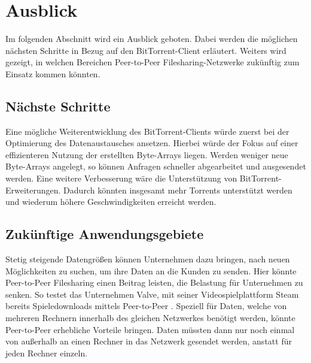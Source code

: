 \section{Ausblick}

Im folgenden Abschnitt wird ein Ausblick geboten. Dabei werden die möglichen nächsten Schritte in Bezug auf den BitTorrent-Client erläutert. Weiters wird gezeigt, in welchen Bereichen Peer-to-Peer Filesharing-Netzwerke zukünftig zum Einsatz kommen könnten. 

\subsection{Nächste Schritte}

Eine mögliche Weiterentwicklung des BitTorrent-Clients würde zuerst bei der Optimierung des Datenaustausches ansetzen. Hierbei würde der Fokus auf einer effizienteren Nutzung der erstellten Byte-Arrays liegen. Werden weniger neue Byte-Arrays angelegt, so können Anfragen schneller abgearbeitet und ausgesendet werden. Eine weitere Verbesserung wäre die Unterstützung von BitTorrent-Erweiterungen. Dadurch könnten insgesamt mehr Torrents unterstützt werden und wiederum höhere Geschwindigkeiten erreicht werden.   


\subsection{Zukünftige Anwendungsgebiete}

Stetig steigende Datengrößen können Unternehmen dazu bringen, nach neuen Möglichkeiten zu suchen, um ihre Daten an die Kunden zu senden. Hier könnte Peer-to-Peer Filesharing einen Beitrag leisten, die Belastung für Unternehmen zu senken. So testet das Unternehmen Valve, mit seiner Videospielplattform Steam bereits Spieledownloads mittels Peer-to-Peer \parencite{steamP2P}. Speziell für Daten, welche von mehreren Rechnern innerhalb des gleichen Netzwerkes benötigt werden, könnte Peer-to-Peer erhebliche Vorteile bringen. Daten müssten dann nur noch einmal von außerhalb an einen Rechner in das Netzwerk gesendet werden, anstatt für jeden Rechner einzeln.